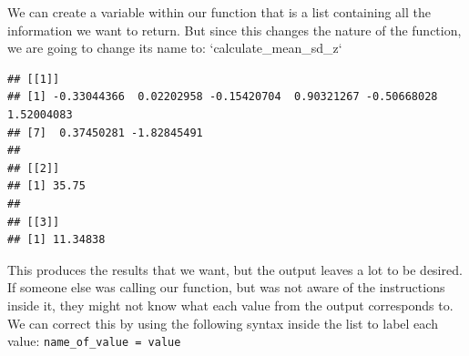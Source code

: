 \documentclass[
]{book}
\newenvironment{Shaded}{\begin{snugshade}}{\end{snugshade}}
\newcommand{\CommentTok}[1]{\textcolor[rgb]{0.56,0.35,0.01}{\textit{#1}}}
\newcommand{\ControlFlowTok}[1]{\textcolor[rgb]{0.13,0.29,0.53}{\textbf{#1}}}
\newcommand{\FunctionTok}[1]{\textcolor[rgb]{0.13,0.29,0.53}{\textbf{#1}}}
\newcommand{\NormalTok}[1]{#1}
\newcommand{\OtherTok}[1]{\textcolor[rgb]{0.56,0.35,0.01}{#1}}
\newcommand{\SpecialCharTok}[1]{\textcolor[rgb]{0.81,0.36,0.00}{\textbf{#1}}}
\begin{document}
We can create a variable within our function that is a list containing all the information we want to return. But since this changes the nature of the function, we are going to change its name to: `calculate\_mean\_sd\_z`

\begin{Shaded}
\end{Shaded}

\begin{verbatim}
## [[1]]
## [1] -0.33044366  0.02202958 -0.15420704  0.90321267 -0.50668028  1.52004083
## [7]  0.37450281 -1.82845491
## 
## [[2]]
## [1] 35.75
## 
## [[3]]
## [1] 11.34838
\end{verbatim}

This produces the results that we want, but the output leaves a lot to be desired. If someone else was calling our function, but was not aware of the instructions inside it, they might not know what each value from the output corresponds to. We can correct this by using the following syntax inside the list to label each value: \texttt{name\_of\_value\ =\ value}
\end{document}
